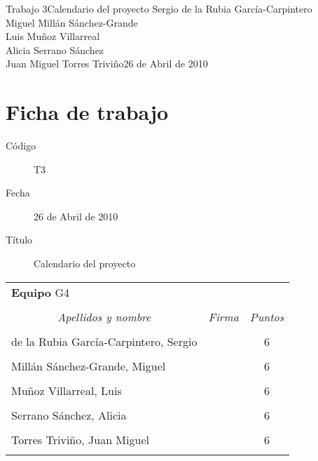 \documentclass[11pt,a4paper,spanish,twoside]{report}
\begin{document}


{Trabajo 3}{Calendario del proyecto}
{Sergio de la Rubia García-Carpintero\\Miguel Millán Sánchez-Grande\\
  Luis Muñoz Villarreal\\Alicia Serrano Sánchez\\
  Juan Miguel Torres Triviño}{26 de Abril de 2010}


\chapter*{Ficha de trabajo}
\begin{description}
\item[Código] T3
\item[Fecha] 26 de Abril de 2010
\item[Título] Calendario del proyecto
\end{description}

\begin{table}[!ht]
  \centering
  \begin{tabular}{lp{5cm}c}
    \multicolumn{3}{l}{\Large \textbf{Equipo} G4} \\ \\
    \multicolumn{1}{c}{\emph{Apellidos y nombre}} & 
    \multicolumn{1}{c}{\emph{Firma}} & \emph{Puntos} \\
    \hline \\
    de la Rubia García-Carpintero, Sergio & & 6 \\ \\
    Millán Sánchez-Grande, Miguel         & & 6 \\ \\
    Muñoz Villarreal, Luis                & & 6 \\ \\
    Serrano Sánchez, Alicia               & & 6 \\ \\
    Torres Triviño, Juan Miguel           & & 6 \\ \\
    \hline
  \end{tabular}
\end{table}
\end{document}
